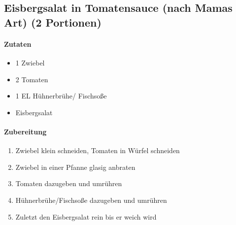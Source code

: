 \newpage
\subsection{Eisbergsalat in Tomatensauce (nach Mamas Art) (2 Portionen)}
\paragraph{Zutaten}
\begin{itemize}[noitemsep]
	\item 1 Zwiebel
	\item 2 Tomaten
	\item 1 EL Hühnerbrühe/ Fischsoße 
	\item Eisbergsalat
\end{itemize}
\paragraph{Zubereitung}
\begin{enumerate}[noitemsep]
	\item Zwiebel klein schneiden, Tomaten in Würfel schneiden
	\item Zwiebel in einer Pfanne glasig anbraten
	\item Tomaten dazugeben und umrühren
	\item Hühnerbrühe/Fischsoße dazugeben und umrühren
	\item Zuletzt den Eisbergsalat rein bis er weich wird
\end{enumerate}
